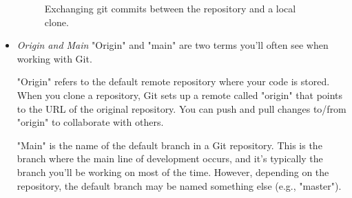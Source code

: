 \begin{itemize}
\begin{figure}[H]
    \centering
    \caption{Exchanging git commits between the repository and a local clone.}
\end{figure}

\item \emph{Origin and Main}
"Origin" and "main" are two terms you'll often see when working with Git.

"Origin" refers to the default remote repository where your code is stored. 
When you clone a repository, Git sets up a remote called "origin" that points to the URL of the original repository. 
You can push and pull changes to/from "origin" to collaborate with others.

"Main" is the name of the default branch in a Git repository. This is the branch where the main line of development occurs, and it's typically the branch you'll be working on most of the time. 
However, depending on the repository, the default branch may be named something else (e.g., "master").
\end{itemize}
